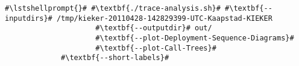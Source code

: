 \begin{lstlisting}[caption=Commands to produce the diagrams under \UnixLikeSystems,label=lst:traceAnalysis:sequenceDiagram]
#\lstshellprompt{}# #\textbf{./trace-analysis.sh}# #\textbf{--inputdirs}# /tmp/kieker-20110428-142829399-UTC-Kaapstad-KIEKER
                     #\textbf{--outputdir}# out/
                     #\textbf{--plot-Deployment-Sequence-Diagrams}#
                     #\textbf{--plot-Call-Trees}#
		     #\textbf{--short-labels}#
\end{lstlisting}
